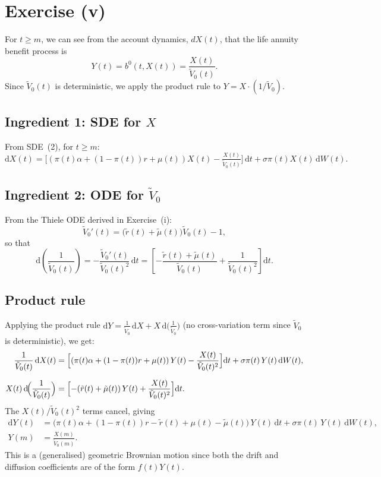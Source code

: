 \section*{Exercise (v)}

For $t \geq m$, we can see from the account dynamics, $dX(t)$, that the life annuity benefit process is
\[
  Y(t) = b^0(t,X(t)) = \frac{X(t)}{\tilde{V}_0(t)}.
\]
Since $\tilde{V}_0(t)$ is deterministic, we apply the product rule to
$Y = X \cdot (1/\tilde{V}_0)$.

\subsection*{Ingredient 1: SDE for $X$}

From SDE~(2), for $t \geq m$:
\[
  \mathrm{d}X(t) = \bigl[(\pi(t)\alpha + (1-\pi(t))r + \mu(t))X(t)
    - \tfrac{X(t)}{\tilde{V}_0(t)}\bigr]\,\mathrm{d}t
    + \sigma\pi(t)X(t)\,\mathrm{d}W(t).
\]

\subsection*{Ingredient 2: ODE for $\tilde{V}_0$}

From the Thiele ODE derived in Exercise~(i):
\[
  \tilde{V}_0'(t) = \bigl(\tilde{r}(t)+\tilde{\mu}(t)\bigr)\tilde{V}_0(t) - 1,
\]
so that
\[
  \mathrm{d}\!\left(\frac{1}{\tilde{V}_0(t)}\right)
  = -\frac{\tilde{V}_0'(t)}{\tilde{V}_0(t)^2}\,\mathrm{d}t
  = \left[-\frac{\tilde{r}(t)+\tilde{\mu}(t)}{\tilde{V}_0(t)}
    + \frac{1}{\tilde{V}_0(t)^2}\right]\mathrm{d}t.
\]

\subsection*{Product rule}

Applying the product rule $\mathrm{d}Y = \frac{1}{\tilde{V}_0}\,\mathrm{d}X
+ X\,\mathrm{d}\!\bigl(\frac{1}{\tilde{V}_0}\bigr)$
(no cross-variation term since $\tilde{V}_0$ is deterministic), we get:
\begin{align*}
  \frac{1}{\tilde{V}_0(t)}\,\mathrm{d}X(t)
  &= \Bigl[(\pi(t)\alpha+(1-\pi(t))r+\mu(t))\,Y(t)
    - \frac{X(t)}{\tilde{V}_0(t)^2}\Bigr]\mathrm{d}t
    + \sigma\pi(t)\,Y(t)\,\mathrm{d}W(t), \\[6pt]
  X(t)\,\mathrm{d}\!\Bigl(\frac{1}{\tilde{V}_0(t)}\Bigr)
  &= \Bigl[-(\tilde{r}(t)+\tilde{\mu}(t))\,Y(t)
    + \frac{X(t)}{\tilde{V}_0(t)^2}\Bigr]\mathrm{d}t.
\end{align*}
The $X(t)/\tilde{V}_0(t)^2$ terms cancel, giving
\begin{align*}
  \mathrm{d}Y(t) &= \bigl(\pi(t)\alpha + (1-\pi(t))r
    - \tilde{r}(t) + \mu(t) - \tilde{\mu}(t)\bigr)\,Y(t)\,\mathrm{d}t
    + \sigma\pi(t)\,Y(t)\,\mathrm{d}W(t), \\
  Y(m) &= \frac{X(m)}{\tilde{V}_0(m)}.
\end{align*}
This is a (generalised) geometric Brownian motion since both the drift and diffusion
coefficients are of the form $f(t)Y(t)$.

